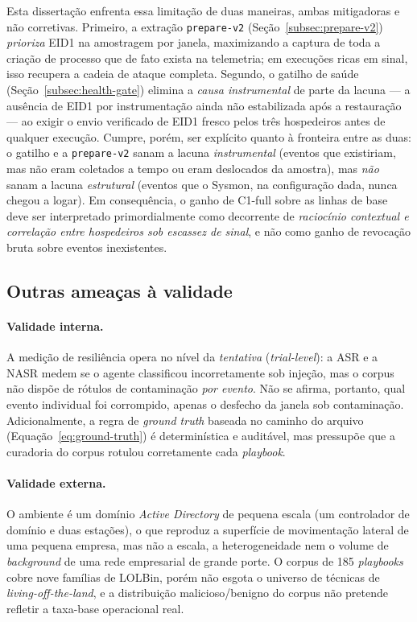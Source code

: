 Esta dissertação enfrenta essa limitação de duas maneiras, ambas mitigadoras e
não corretivas. Primeiro, a extração \texttt{prepare-v2}
(Seção~\ref{subsec:prepare-v2}) \emph{prioriza} EID1 na amostragem por janela,
maximizando a captura de toda a criação de processo que de fato exista na
telemetria; em execuções ricas em sinal, isso recupera a cadeia de ataque
completa. Segundo, o gatilho de saúde (Seção~\ref{subsec:health-gate}) elimina a
\emph{causa instrumental} de parte da lacuna --- a ausência de EID1 por
instrumentação ainda não estabilizada após a restauração --- ao exigir o envio
verificado de EID1 fresco pelos três hospedeiros antes de qualquer execução.
Cumpre, porém, ser explícito quanto à fronteira entre as duas: o gatilho e a
\texttt{prepare-v2} sanam a lacuna \emph{instrumental} (eventos que existiriam,
mas não eram coletados a tempo ou eram deslocados da amostra), mas \emph{não}
sanam a lacuna \emph{estrutural} (eventos que o Sysmon, na configuração dada,
nunca chegou a logar). Em consequência, o ganho de C1-full sobre as linhas de
base deve ser interpretado primordialmente como decorrente de \emph{raciocínio
contextual e correlação entre hospedeiros sob escassez de sinal}, e não como
ganho de revocação bruta sobre eventos inexistentes.

\subsection{Outras ameaças à validade}

\paragraph{Validade interna.} A medição de resiliência opera no nível da
\emph{tentativa} (\textit{trial-level}): a ASR e a NASR medem se o agente
classificou incorretamente sob injeção, mas o corpus não dispõe de rótulos de
contaminação \emph{por evento}. Não se afirma, portanto, qual evento individual
foi corrompido, apenas o desfecho da janela sob contaminação. Adicionalmente, a
regra de \textit{ground truth} baseada no caminho do arquivo
(Equação~\ref{eq:ground-truth}) é determinística e auditável, mas pressupõe que a
curadoria do corpus rotulou corretamente cada \textit{playbook}.

\paragraph{Validade externa.} O ambiente é um domínio \textit{Active Directory}
de pequena escala (um controlador de domínio e duas estações), o que reproduz a
superfície de movimentação lateral de uma pequena empresa, mas não a escala, a
heterogeneidade nem o volume de \textit{background} de uma rede empresarial de
grande porte. O corpus de 185 \textit{playbooks} cobre nove famílias de LOLBin,
porém não esgota o universo de técnicas de \textit{living-off-the-land}, e a
distribuição malicioso/benigno do corpus não pretende refletir a taxa-base
operacional real.

